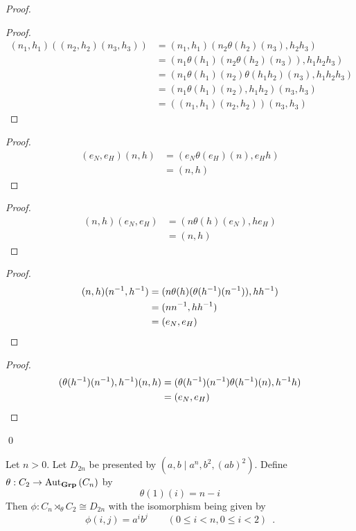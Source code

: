 \begin{proof}
\pf
{}
\begin{proof}
	\pf
	\begin{align*}
		(n_1,h_1) ((n_2,h_2)(n_3,h_3))
		& = (n_1,h_1)(n_2 \theta(h_2)(n_3), h_2 h_3) \\
		& = (n_1 \theta(h_1)(n_2 \theta(h_2)(n_3)), h_1 h_2 h_3) \\
		& = (n_1 \theta(h_1)(n_2) \theta(h_1h_2)(n_3), h_1 h_2 h_3) \\
		& = (n_1 \theta(h_1)(n_2), h_1 h_2)(n_3, h_3) \\
		& = ((n_1,h_1) (n_2,h_2)) (n_3,h_3)
	\end{align*}
\end{proof}
\begin{proof}
	\pf
	\begin{align*}
		(e_N,e_H)(n,h) & = (e_N \theta(e_H)(n), e_Hh) \\
		& = (n,h)
	\end{align*}
\end{proof}
\begin{proof}
	\pf
	\begin{align*}
		(n,h)(e_N,e_H) & = (n \theta(h)(e_N), h e_H) \\
		& = (n,h)
	\end{align*}
\end{proof}
\begin{proof}
	\pf
	\begin{align*}
		(n,h)({n}^{-1},{h}^{-1}) & = (n \theta(h)(\theta({h}^{-1})({n}^{-1})), h {h}^{-1}) \\
		& = (n {n}^{-1}, h {h}^{-1}) \\
		& = (e_N, e_H)
	\end{align*}
\end{proof}
\begin{proof}
	\pf
	\begin{align*}
		(\theta({h}^{-1})({n}^{-1}), {h}^{-1})(n,h) & = (\theta({h}^{-1})({n}^{-1}) \theta({h}^{-1})(n), {h}^{-1}h) \\
		& = (e_N,e_H)
	\end{align*}
\end{proof}
\qed
\end{proof}

\begin{ex}
Let $n > 0$. Let $D_{2n}$ be presented by $(a,b \mid a^n, b^2, (ab)^2)$. Define $\theta : C_2 \rightarrow \mathrm{Aut}_{\mathbf{Grp}} \left( {C_n} \right)$ by
\[ \theta(1)(i) = n-i \]
Then $\phi : C_n \rtimes_\theta C_2 \cong D_{2n}$ with the isomorphism being given by
\[ \phi(i,j) = a^ib^j \qquad (0 \leq i < n, 0 \leq i < 2) \enspace . \]
\end{ex}


